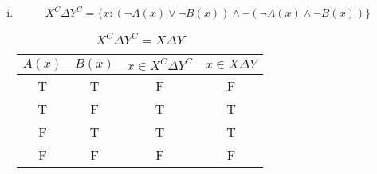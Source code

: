 \documentclass{article}
\begin{document}
\begin{enumerate}[i)]
\item
$$X^C\Delta Y^C=\{x:(\lnot A(x)\lor\lnot B(x))\land\lnot(\lnot A(x)\land \lnot B(x))\}$$
\begin{table}[!h]
\begin{center}
\begin{tabular}{cccc}
\hline
$A(x)$ & $B(x)$ & $x\in X^C\Delta Y^C$ & $x\in X\Delta Y$\\
\hline
T & T & F & F\\
T & F & T & T\\
F & T & T & T\\
F & F & F & F\\
\hline
\end{tabular}
\end{center}
\caption*{$X^C\Delta Y^C=X\Delta Y$}
\end{table}


\end{enumerate}
\end{document}
